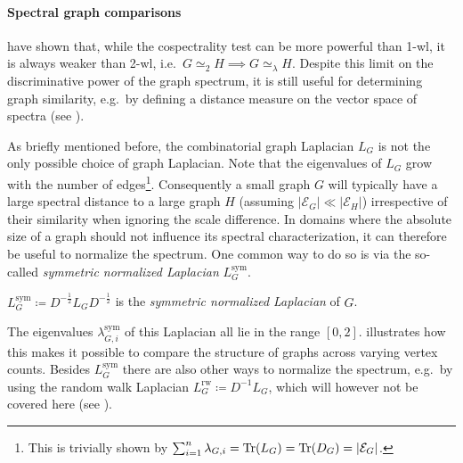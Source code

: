 {\setlength{\parskip}{0pt}\paragraph{Spectral graph comparisons}
\citet{Alzaga2010} have shown that, while the cospectrality test can be more powerful than 1-\acs{wl}, it is always weaker than 2-\acs{wl}, i.e.\ $G \mathrel{\simeq_2} H \implies G \mathrel{\simeq_\lambda} H$.
Despite this limit on the discriminative power of the graph spectrum, it is still useful for determining graph similarity, e.g.\ by defining a distance measure on the vector space of spectra (see \citet{Gu2015}).}

As briefly mentioned before, the combinatorial graph Laplacian $L_G$ is not the only possible choice of graph Laplacian.
Note that the eigenvalues of $L_G$ grow with the number of edges\footnote{
	This is trivially shown by $\sum_{i=1}^n \lambda_{G,i} = \operatorname{Tr}(L_G) = \operatorname{Tr}(D_G) = |\mathcal{E}_G|$.
}.
Consequently a small graph $G$ will typically have a large spectral distance to a large graph $H$ (assuming ${|\mathcal{E}_G|} \ll {|\mathcal{E}_H|}$) irrespective of their similarity when ignoring the scale difference.
In domains where the absolute size of a graph should not influence its spectral characterization, it can therefore be useful to normalize the spectrum.
One common way to do so is via the so-called \textit{symmetric normalized Laplacian} $L^{\text{sym}}_G$.
\begin{defn}\label{defn:related:laplacian-sym}
	$L^{\text{sym}}_G \coloneqq D^{-\frac{1}{2}} L_G D^{-\frac{1}{2}}$ is the \textit{symmetric normalized Laplacian} of $G$.
\end{defn}
The eigenvalues $\lambda^{\text{sym}}_{G, i}$  of this Laplacian all lie in the range $[0, 2]$.
 illustrates how this makes it possible to compare the structure of graphs across varying vertex counts.
Besides $L^{\text{sym}}_G$ there are also other ways to normalize the spectrum, e.g.\ by using the random walk Laplacian $L^{\text{rw}}_G \coloneqq D^{-1} L_G$, which will however not be covered here (see \citet{Shuman2013}).
